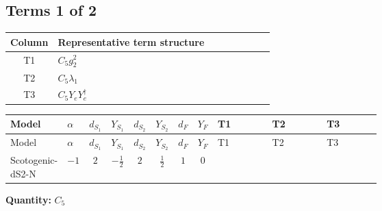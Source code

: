 \documentclass[8pt]{article}
\begin{document}
\begin{landscape}
\subsection*{Terms 1 of 2}
\begin{center}
\begin{tabular}{@{}c >{\raggedright\arraybackslash}p{0.82\linewidth}@{}}
\toprule
Column & Representative term structure \\
\midrule
T1 & \(\displaystyle C_{5} g_{2}^{2}\) \\
\midrule
T2 & \(\displaystyle C_{5} \lambda_1\) \\
\midrule
T3 & \(\displaystyle C_{5} Y_e Y_e^\dagger\) \\
\midrule
\bottomrule
\end{tabular}
\end{center}
\smallskip
\tiny
\begin{longtable}{@{}llcccccc >{\raggedright\arraybackslash}p{0.21\linewidth} >{\raggedright\arraybackslash}p{0.21\linewidth} >{\raggedright\arraybackslash}p{0.21\linewidth}@{}}
\toprule
Model & $\alpha$ & $d_{S_1}$ & $Y_{S_1}$ & $d_{S_2}$ & $Y_{S_2}$ & $d_F$ & $Y_F$ & T1 & T2 & T3 \\
\midrule
\endfirsthead
\toprule
Model & $\alpha$ & $d_{S_1}$ & $Y_{S_1}$ & $d_{S_2}$ & $Y_{S_2}$ & $d_F$ & $Y_F$ & T1 & T2 & T3 \\
\midrule
\endhead
Scotogenic-dS2-N & $-1$ & $2$ & $-\frac{1}{2}$ & $2$ & $\frac{1}{2}$ & $1$ & $0$ & \scriptsize\adjustbox{max width=\linewidth}{$\begin{gathered} - 3 C_{5} g_{2}^{2}\end{gathered}$} & \scriptsize\adjustbox{max width=\linewidth}{$\begin{gathered} 2 C_{5} \lambda_1\end{gathered}$} & \scriptsize\adjustbox{max width=\linewidth}{$\begin{gathered} - C_{5} Y_e Y_e^\dagger\end{gathered}$} \\
\midrule
\bottomrule
\end{longtable}
\clearpage
\noindent\textbf{Quantity: }$C_5$\par\smallskip

\end{landscape}
\end{document}
